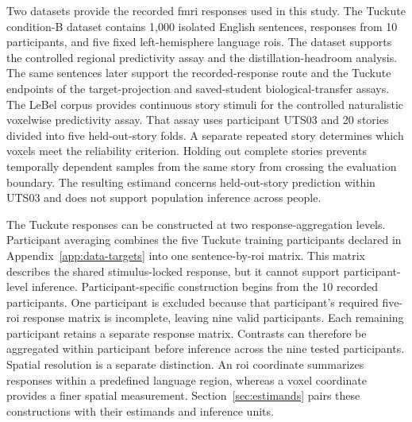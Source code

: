 Two datasets provide the recorded \ac{fmri} responses used in this study.
The Tuckute condition-B dataset \autocite{tuckute2024} contains 1,000 isolated English sentences, responses from 10 participants, and five fixed left-hemisphere language \acp{roi}.
The dataset supports the controlled regional predictivity assay and the distillation-headroom analysis.
The same sentences later support the recorded-response route and the Tuckute endpoints of the target-projection and saved-student biological-transfer assays.
The LeBel corpus \autocite{lebel2023} provides continuous story stimuli for the controlled naturalistic voxelwise predictivity assay.
That assay uses participant UTS03 and 20 stories divided into five held-out-story folds.
A separate repeated story determines which voxels meet the reliability criterion.
Holding out complete stories prevents temporally dependent samples from the same story from crossing the evaluation boundary.
The resulting estimand concerns held-out-story prediction within UTS03 and does not support population inference across people.

The Tuckute responses can be constructed at two response-aggregation levels.
Participant averaging combines the five Tuckute training participants declared in Appendix~\ref{app:data-targets} into one sentence-by-\ac{roi} matrix.
This matrix describes the shared stimulus-locked response, but it cannot support participant-level inference.
Participant-specific construction begins from the 10 recorded participants.
One participant is excluded because that participant's required five-\ac{roi} response matrix is incomplete, leaving nine valid participants.
Each remaining participant retains a separate response matrix.
Contrasts can therefore be aggregated within participant before inference across the nine tested participants.
Spatial resolution is a separate distinction.
An \ac{roi} coordinate summarizes responses within a predefined language region, whereas a voxel coordinate provides a finer spatial measurement.
Section~\ref{sec:estimands} pairs these constructions with their estimands and inference units.

